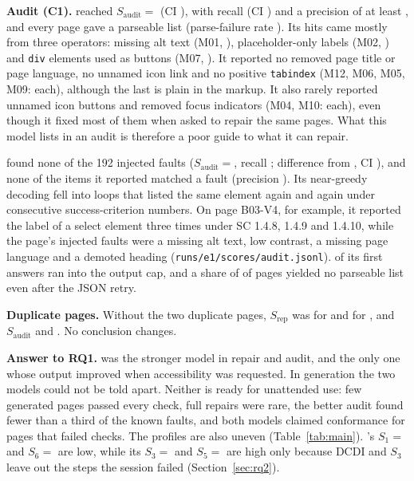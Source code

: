 \textbf{Audit (C1).} \Q{} reached $S_\text{audit}={}$ (CI
), with recall  (CI
) and a precision of at least ,
and every page gave a parseable list (parse-failure rate ).
Its hits came mostly from three operators: missing alt text (M01, ),
placeholder-only labels (M02, ) and \texttt{div} elements
used as buttons (M07, ). It reported no removed page title or
page language, no unnamed icon link and no positive \texttt{tabindex} (M12, M06, M05, M09:
 each), although the last is plain in the markup. It also
rarely reported unnamed icon buttons and removed focus indicators (M04, M10:
 each), even though it fixed most of them when asked to
repair the same pages. What this model lists in an audit is therefore a poor guide to what it can
repair.

\QV{} found none of the 192 injected faults ($S_\text{audit}={}$,
recall ; difference from \Q{}
, CI
), and none of the items it reported matched a
fault (precision ). Its near-greedy decoding fell into
loops that listed the same element again and again under consecutive success-criterion numbers.
On page B03-V4, for example, it reported the label of a select element three times under SC 1.4.8, 1.4.9 and
1.4.10, while the page's injected faults were a missing alt text, low contrast, a missing page
language and a demoted heading (\texttt{runs/e1/scores/audit.jsonl}).
 of its  first
answers ran into the output cap, and a share of  of pages
yielded no parseable list even after the JSON retry.

\textbf{Duplicate pages.} Without the two duplicate pages, $S_\text{rep}$ was
 for \Q{} and  for \QV{}, and
$S_\text{audit}$  and . No
conclusion changes.

\textbf{Answer to RQ1.} \Q{} was the stronger model in repair and audit, and the only one whose
output improved when accessibility was requested. In generation the two models could not be told
apart. Neither is ready for unattended use: few generated pages passed every check, full repairs
were rare, the better audit found fewer than a third of the known faults, and both models claimed
conformance for pages that failed checks. The profiles are also uneven (Table~\ref{tab:main}). \Q's
$S_1={}$ and $S_6={}$ are low, while its
$S_3={}$ and $S_5={}$ are high only because DCDI and
$S_3$ leave out the steps the session failed (Section~\ref{sec:rq2}).

